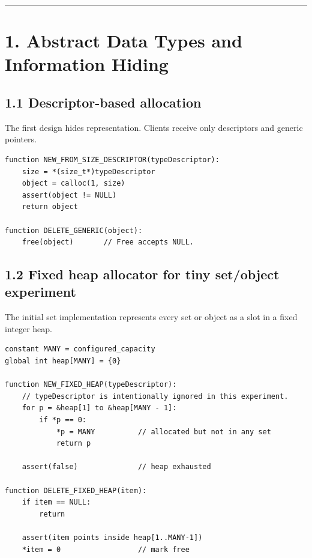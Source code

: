 \documentclass[11pt]{article}
\begin{document}
\begin{center}\rule{0.5\linewidth}{0.5pt}\end{center}

\section{1. Abstract Data Types and Information
Hiding}\label{abstract-data-types-and-information-hiding}

\subsection{1.1 Descriptor-based
allocation}\label{descriptor-based-allocation}

The first design hides representation. Clients receive only descriptors
and generic pointers.

\begin{verbatim}
function NEW_FROM_SIZE_DESCRIPTOR(typeDescriptor):
    size = *(size_t*)typeDescriptor
    object = calloc(1, size)
    assert(object != NULL)
    return object

function DELETE_GENERIC(object):
    free(object)       // Free accepts NULL.
\end{verbatim}

\subsection{1.2 Fixed heap allocator for tiny set/object
experiment}\label{fixed-heap-allocator-for-tiny-setobject-experiment}

The initial set implementation represents every set or object as a slot
in a fixed integer heap.

\begin{verbatim}
constant MANY = configured_capacity
global int heap[MANY] = {0}

function NEW_FIXED_HEAP(typeDescriptor):
    // typeDescriptor is intentionally ignored in this experiment.
    for p = &heap[1] to &heap[MANY - 1]:
        if *p == 0:
            *p = MANY          // allocated but not in any set
            return p

    assert(false)              // heap exhausted

function DELETE_FIXED_HEAP(item):
    if item == NULL:
        return

    assert(item points inside heap[1..MANY-1])
    *item = 0                  // mark free
\end{verbatim}
\end{document}
